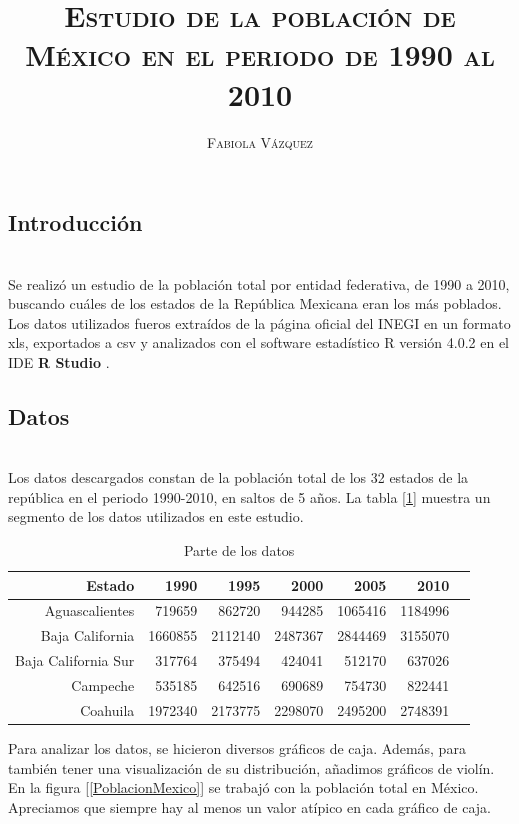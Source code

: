 \documentclass[12pt,letterpaper]{article}
\title{\textsc{Estudio de la población de México en el periodo de 1990 al 2010}}
\author{\textsc{Fabiola Vázquez}}
\begin{document}
\maketitle

\subsection*{Introducción}~\\
Se realizó un estudio de la población total por entidad federativa, de 1990 a 2010, buscando cuáles de los estados de la República Mexicana eran los más poblados. Los datos utilizados fueros extraídos de la página oficial del INEGI \cite{inegi} en un formato \textrm{xls}, exportados a \textrm{csv} y analizados con el software estadístico R versión 4.0.2 \cite{R} en el IDE \textbf{R Studio} \cite{rstudio}. 

\subsection*{Datos}~\\
Los datos descargados constan de la población total de los 32 estados de la república en el periodo 1990-2010, en saltos de 5 años. La tabla [\ref{tab:Datos}] muestra un segmento de los datos utilizados en este estudio.
\begin{table}[ht]
\centering
\begin{tabular}{rrrrrrr}
  \hline
 Estado & 1990 & 1995 & 2000 & 2005 & 2010 \\ 
  \hline
Aguascalientes & 719659 & 862720 & 944285 & 1065416 & 1184996 \\ 
 Baja California & 1660855 & 2112140 & 2487367 & 2844469 & 3155070 \\ 
 Baja California Sur & 317764 & 375494 & 424041 & 512170 & 637026 \\ 
 Campeche & 535185 & 642516 & 690689 & 754730 & 822441 \\ 
 Coahuila & 1972340 & 2173775 & 2298070 & 2495200 & 2748391 \\ 
   \hline
\end{tabular}
\caption{Parte de los datos}
\label{tab:Datos}
\end{table}

\newpage
Para analizar los datos, se hicieron diversos gráficos de caja. Además, para también tener una visualización de su distribución, añadimos gráficos de violín. En la figura [\ref{PoblacionMexico}] se trabajó con la población total en México. Apreciamos que siempre hay al menos un valor atípico en cada gráfico de caja.
\end{document}
